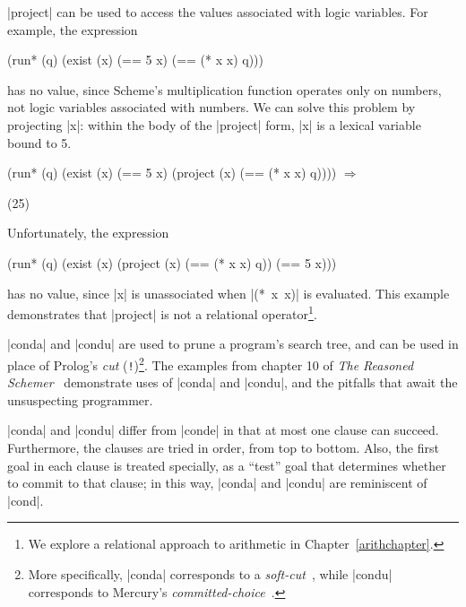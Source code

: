 \scheme|project| can be used to access the values associated with
logic variables.  For example, the expression

\schemedisplayspace
\begin{schemedisplay}
(run* (q)
  (exist (x)
    (== 5 x)
    (== (* x x) q)))
\end{schemedisplay}

\noindent has no value, since Scheme's multiplication function
operates only on numbers, not logic variables associated with numbers.
We can solve this problem by projecting \scheme|x|: within the body of
the \scheme|project| form, \scheme|x| is a lexical variable bound to
5.

\schemedisplayspace
\begin{schemedisplay}
(run* (q)
  (exist (x)
    (== 5 x)
    (project (x)
      (== (* x x) q)))) $\Rightarrow$ 
\end{schemedisplay}
\nspace
\begin{schemeresponse}
(25)
\end{schemeresponse}

\noindent Unfortunately, the expression

\schemedisplayspace
\begin{schemedisplay}
(run* (q)
  (exist (x)
    (project (x)
      (== (* x x) q))
    (== 5 x)))
\end{schemedisplay}

\noindent has no value, since \scheme|x| is unassociated when
\mbox{\scheme|(* x x)|} is evaluated.  This example demonstrates that
\scheme|project| is not a relational operator\footnote{We explore a
  relational approach to arithmetic in Chapter~\ref{arithchapter}.}.

\scheme|conda| and \scheme|condu| are used to prune a program's search
tree, and can be used in place of Prolog's \emph{cut} ({\tt !})\footnote{More specifically, 
\scheme|conda| corresponds to a \emph{soft-cut}~\cite{ClocksinClause}, while \scheme|condu|
  corresponds to Mercury's \emph{committed-choice}~\cite{Fergus-Henderson:1996uq,Naish:1995pr}.}.
The examples from chapter 10 of \emph{The Reasoned Schemer}~\cite{trs}
demonstrate uses of \scheme|conda| and \scheme|condu|, and
the pitfalls that await the unsuspecting programmer.

\scheme|conda| and \scheme|condu| differ from \scheme|conde| in that
at most one clause can succeed.  Furthermore, the clauses are tried in
order, from top to bottom.  Also, the first goal in each clause is
treated specially, as a ``test'' goal that determines whether to
commit to that clause; in this way, \scheme|conda| and \scheme|condu|
are reminiscent of \scheme|cond|.

